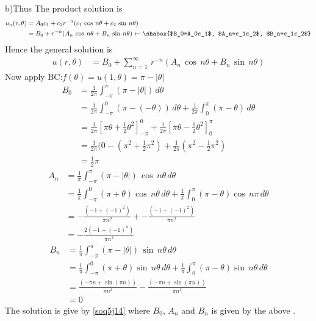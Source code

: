 b)Thus The product  solution is
\begin{align}
u_n(r,\theta)&=A_0c_1+c_2r^{-n}(c_1\,\cos\,n\theta+c_2\,\sin\,n\theta)\\
&=B_0+r^{-n}(A_n\,\cos\,n\theta+B_n\,\sin\,n\theta)\leftarrow\shabox{$B_0=A_0c_1$, $A_n=c_1c_2$, $B_n=c_1c_2$}
\end{align}
Hence the general solution is
\begin{align}
u(r,\theta)&=B_0+\sum_{n=1}^\infty\,r^{-n}(A_n\,\cos\,n\theta+B_n\,\sin\,n\theta)\label{soq5j14}
\end{align}
Now apply BC:$f(\theta)=u(1,\theta)=\pi-|\theta|$
\begin{align*}
B_0&=\frac{1}{2\pi}\int_{-\pi}^{\pi}(\pi-|\theta|)\,d\theta\\
&=\frac{1}{2\pi}\int_{-\pi}^0(\pi-(-\theta))\,d\theta+\frac{1}{2\pi}\int_{0}^{\pi}(\pi-\theta)\,d\theta\\
&=\frac{1}{2\pi}\left[\pi\theta+\frac{1}{2}\theta^2\right]_{-\pi}^0+\frac{1}{2\pi}\left[\pi\theta-\frac{1}{2}\theta^2\right]_0^\pi\\
&=\frac{1}{2\pi}(0-(\pi^2+\frac{1}{2}\pi^2)+\frac{1}{2\pi}(\pi^2-\frac{1}{2}\pi^2)\\
&=\frac{1}{2}\pi
\end{align*}
\begin{align*}
A_n&=\frac{1}{\pi}\int_{-\pi}^\pi(\pi-|\theta|)\,\cos\,n\theta\,d\theta\\
&=\frac{1}{\pi}\int_{-\pi}^0(\pi+\theta)\cos\,n\theta\,d\theta+\frac{1}{\pi}\int_0^\pi(\pi-\theta)\cos\,n\pi\,d\theta\\
&=-\frac{(-1+(-1)^2)}{\pi n^2}+-\frac{(-1+(-1)^2)}{\pi n^2}\\
&=-\frac{2(-1+(-1)^n)}{\pi n^2}
\end{align*}
\begin{align}
B_n&=\frac{1}{\pi}\int_{-\pi}^\pi(\pi-|\theta|)\,\sin\,n\theta\,d\theta\nonumber\\
&=\frac{1}{\pi}\int_{-\pi}^0(\pi+\theta)\sin\,n\theta\,d\theta+\frac{1}{\pi}\int_0^\pi(\pi-\theta)\sin\,n\theta\,d\theta\nonumber\\
&=\frac{(-\pi n+\sin(\pi n))}{\pi n^2}-\frac{(-\pi n+\sin(\pi n))}{\pi n^2}\\
&=0
\end{align}
The solution is give by \eqref{soq5j14} where $B_0$, $A_n$ and $B_n$ is given by the above .




